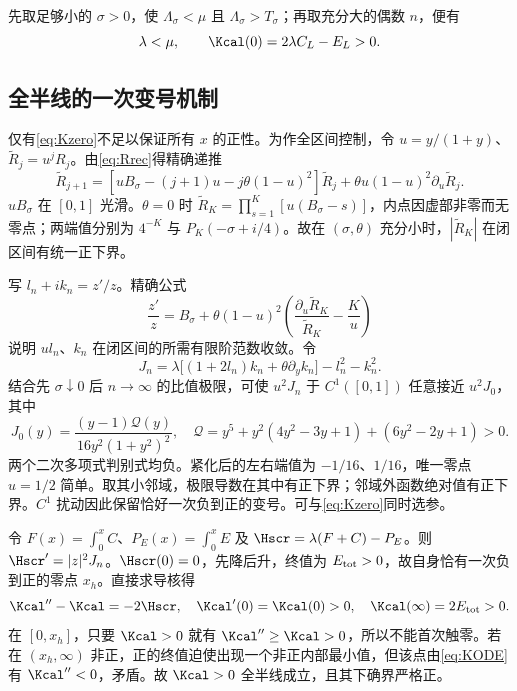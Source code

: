 先取足够小的 $\sigma>0$，使 $\Lambda_\sigma<\mu$ 且 $\Lambda_\sigma>T_\sigma$；再取充分大的偶数 $n$，便有
\begin{equation}\label{eq:Kzero}
\lambda<\mu,\qquad \Kcal(0)=2\lambda C_L-E_L>0.
\end{equation}

\subsection{全半线的一次变号机制}
仅有\eqref{eq:Kzero}不足以保证所有 $x$ 的正性。为作全区间控制，令 $u=y/(1+y)$、$\widetilde R_j=u^jR_j$。由\eqref{eq:Rrec}得精确递推
\begin{equation}\label{eq:compactrec}
\widetilde R_{j+1}
=[uB_\sigma-(j+1)u-j\theta(1-u)^2]\widetilde R_j
+\theta u(1-u)^2\partial_u\widetilde R_j.
\end{equation}
$uB_\sigma$ 在 $[0,1]$ 光滑。$\theta=0$ 时
$\widetilde R_K=\prod_{s=1}^K[u(B_\sigma-s)]$，内点因虚部非零而无零点；两端值分别为 $4^{-K}$ 与 $P_K(-\sigma+i/4)$。故在 $(\sigma,\theta)$ 充分小时，$|\widetilde R_K|$ 在闭区间有统一正下界。

写 $l_n+ik_n=z'/z$。精确公式
\[
\frac{z'}z=B_\sigma+\theta(1-u)^2
\left(\frac{\partial_u\widetilde R_K}{\widetilde R_K}-\frac K u\right)
\]
说明 $ul_n$、$k_n$ 在闭区间的所需有限阶范数收敛。令
\[
J_n=\lambda\bigl[(1+2l_n)k_n+\theta\partial_yk_n\bigr]-l_n^2-k_n^2.
\]
结合先 $\sigma\downarrow0$ 后 $n\to\infty$ 的比值极限，可使 $u^2J_n$ 于 $C^1([0,1])$ 任意接近 $u^2J_0$，其中
\begin{equation}\label{eq:Jfactor}
J_0(y)=\frac{(y-1)\mathcal Q(y)}{16y^2(1+y^2)^2},\quad
\mathcal Q=y^5+y^2(4y^2-3y+1)+(6y^2-2y+1)>0.
\end{equation}
两个二次多项式判别式均负。紧化后的左右端值为 $-1/16$、$1/16$，唯一零点 $u=1/2$ 简单。取其小邻域，极限导数在其中有正下界；邻域外函数绝对值有正下界。$C^1$ 扰动因此保留恰好一次负到正的变号。可与\eqref{eq:Kzero}同时选参。

令 $F(x)=\int_0^xC$、$P_E(x)=\int_0^xE$ 及
$\Hscr=\lambda(F+C)-P_E$。则 $\Hscr'=|z|^2J_n$。$\Hscr(0)=0$，先降后升，终值为 $E_{\rm tot}>0$，故自身恰有一次负到正的零点 $x_h$。直接求导核得
\begin{equation}\label{eq:KODE}
\Kcal''-\Kcal=-2\Hscr,\quad
\Kcal'(0)=\Kcal(0)>0,\quad
\Kcal(\infty)=2E_{\rm tot}>0.
\end{equation}
在 $[0,x_h]$，只要 $\Kcal>0$ 就有 $\Kcal''\ge\Kcal>0$，所以不能首次触零。若在 $(x_h,\infty)$ 非正，正的终值迫使出现一个非正内部最小值，但该点由\eqref{eq:KODE}有 $\Kcal''<0$，矛盾。故 $\Kcal>0$ 全半线成立，且其下确界严格正。

